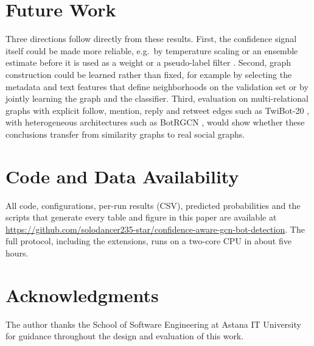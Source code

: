 \documentclass{csimq}
\begin{document}
\section{Future Work}
Three directions follow directly from these results. First, the confidence signal itself could be made more reliable, e.g.\ by temperature scaling or an ensemble estimate before it is used as a weight or a pseudo-label filter \cite{guo2017calibration}. Second, graph construction could be learned rather than fixed, for example by selecting the metadata and text features that define neighborhoods on the validation set or by jointly learning the graph and the classifier. Third, evaluation on multi-relational graphs with explicit follow, mention, reply and retweet edges such as TwiBot-20 \cite{feng2021twibot20}, with heterogeneous architectures such as BotRGCN \cite{feng2021botrgcn}, would show whether these conclusions transfer from similarity graphs to real social graphs.

\section*{Code and Data Availability}
All code, configurations, per-run results (CSV), predicted probabilities and the scripts that generate every table and figure in this paper are available at \url{https://github.com/solodancer235-star/confidence-aware-gcn-bot-detection}. The full protocol, including the extensions, runs on a two-core CPU in about five hours.

\section*{Acknowledgments}
The author thanks the School of Software Engineering at Astana IT University for guidance throughout the design and evaluation of this work.




\end{document}
